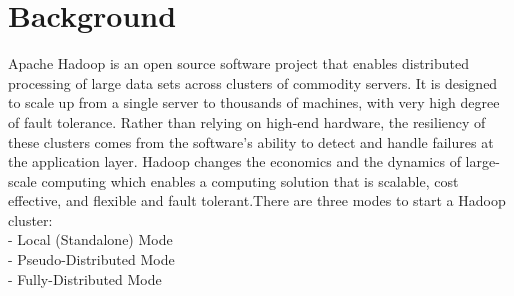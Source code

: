 \documentclass[10pt, conference]{IEEEtran}
\begin{document}
\section{Background}

\indent Apache Hadoop is an open source software project that enables distributed processing of large data sets across clusters of commodity servers. It is designed to scale up from a single server to thousands of machines, with very high degree of fault tolerance. Rather than relying on high-end hardware, the resiliency of these clusters comes from the software's ability to detect and handle failures at the application layer. Hadoop changes the economics and the dynamics of large-scale computing which enables a computing solution that is scalable, cost effective, and flexible and fault tolerant.There are three modes to start a Hadoop cluster:\\
- Local (Standalone) Mode\\
- Pseudo-Distributed Mode\\
- Fully-Distributed Mode\\
\end{document}
